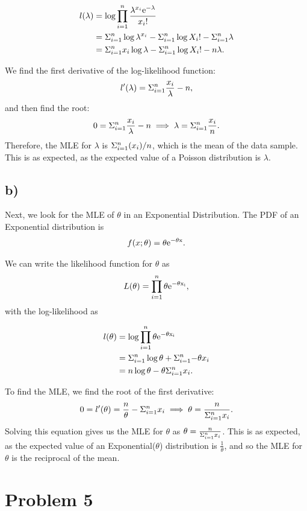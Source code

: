 \documentclass[]{article}
\begin{document}
\begin{align*}
l(\lambda) &=  \log{\prod_{i=1}^{n} \frac{\lambda^{x_i}\rm{e}^{-\lambda}}{x_i!}} \\
          &= \Sigma_{i=1}^{n} \log{\lambda^{x_i}} - \Sigma_{i=1}^{n} \log{X_i!} - \Sigma_{i=1}^{n} \lambda \\
          &=  \Sigma_{i=1}^{n} x_i \log{\lambda} - \Sigma_{i=1}^{n} \log{X_i!} - n \lambda.
\end{align*}

We find the first derivative of the log-likelihood function: \[
l^{\prime}(\lambda) = \Sigma_{i=1}^{n} \frac{x_i}{\lambda} - n,
\] and then find the root: \[
 0 = \Sigma_{i=1}^{n} \frac{x_i}{\lambda} - n \implies \lambda = \Sigma_{i=1}^{n} \frac{x_i}{n}.
 \] Therefore, the MLE for \(\lambda\) is \(\Sigma_{i=1}^{n}(x_i) / n\), which is
the mean of the data sample. This is as expected, as the expected value
of a Poisson distribution is \(\lambda\).

\subsection{b)}\label{b-3}

Next, we look for the MLE of \(\theta\) in an Exponential Distribution.
The PDF of an Exponential distribution is \[
f(x; \theta) = \theta \rm{e}^{-\theta x}.
\]

We can write the likelihood function for \(\theta\) as \[
L(\theta) = \prod_{i=1}^{n}\theta\rm{e}^{-\theta x_i}, 
\] with the log-likelihood as

\begin{align*}
l(\theta) &= \log{\prod_{i=1}^{n}\theta\rm{e}^{-\theta x_i}} \\
&= \Sigma_{i=1}^{n} \log{\theta} + \Sigma_{i=1}^{n}{-\theta x_i} \\
&= n \log{\theta} - \theta \Sigma_{i=1}^{n} x_i.
\end{align*}

To find the MLE, we find the root of the first derivative: \[
0 = l^{\prime}(\theta) = \frac{n}{\theta} -  \Sigma_{i=1}^{n} x_i \implies \theta = \frac{n}{\Sigma_{i=1}^{n} x_i}.
\] Solving this equation gives us the MLE for \(\theta\) as
\(\theta = \frac{n}{\Sigma_{i=1}^{n} x_i}\). This is as expected, as the expected
value of an Exponential(\(\theta\)) distribution is
\(\frac{1}{\theta}\), and so the MLE for \(\theta\) is the reciprocal of
the mean.

\section{Problem 5}\label{problem-5}
\end{document}
